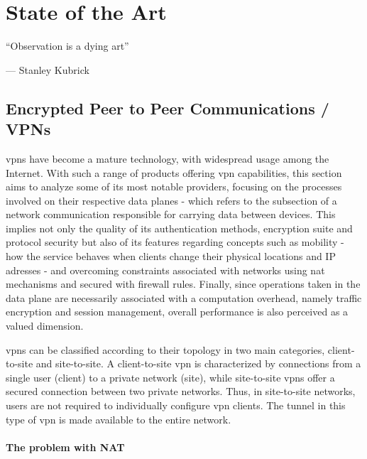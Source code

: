 \documentclass[11pt,twoside,a4paper]{report}
\begin{document}
\cleardoublepage


\chapter{State of the Art}
\label{chapter:sota}

\begin{minipage}{50mm}
     \centering %
     ``Observation is a dying art''
          \begin{flushright}
          --- Stanley Kubrick
          \end{flushright}
     \end{minipage}

\section{Encrypted Peer to Peer Communications / VPNs}

\acrshort{vpn}s have become a mature technology, with widespread usage among the Internet. With such a range of products offering \acrshort{vpn} capabilities, this section aims to analyze some of its most notable providers, focusing on the processes involved on their respective data planes - which refers to the subsection of a network communication responsible for carrying data between devices. This implies not only the quality of its authentication methods, encryption suite and protocol security but also of its features regarding concepts such as mobility - how the service behaves when clients change their physical locations and IP adresses - and overcoming constraints associated with networks using \acrshort{nat} mechanisms and secured with firewall rules. Finally, since operations taken in the data plane are necessarily associated with a computation overhead, namely traffic encryption and session management, overall performance is also perceived as a valued dimension.

\acrshort{vpn}s can be classified according to their topology in two main categories, client-to-site and site-to-site. A client-to-site \acrshort{vpn} is characterized by connections from a single user (client) to a private network (site), while site-to-site \acrshort{vpn}s offer a secured connection between two private networks. Thus, in site-to-site networks, users are not required to individually configure \acrshort{vpn} clients. The tunnel in this type of \acrshort{vpn} is made available to the entire network.

\subsubsection{The problem with NAT}
\end{document}
